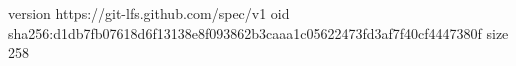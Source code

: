 version https://git-lfs.github.com/spec/v1
oid sha256:d1db7fb07618d6f13138e8f093862b3caaa1c05622473fd3af7f40cf4447380f
size 258

